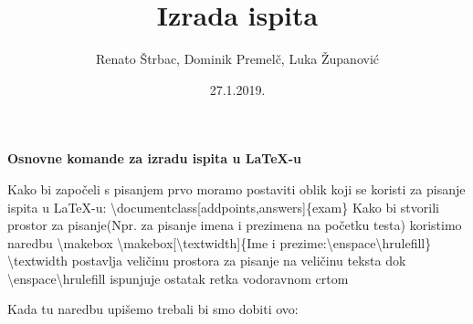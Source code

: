 \documentclass[addpoints,answers]{beamer}
\newcounter{points}
\begin{document}
	\title{Izrada ispita}
	\date{27.1.2019.}
	\author{Renato Štrbac, Dominik Premelč, Luka Županović}
	
	
	\maketitle
	\tableofcontents
	
\begin{frame}
	\begin{center}
		\textbf{Osnovne komande za izradu ispita u LaTeX-u}
	\end{center}
\end{frame}

\begin{frame}
Kako bi započeli s pisanjem prvo moramo postaviti oblik koji se koristi za pisanje ispita u LaTeX-u:
\newline
\newline
\color{blue}
\textbackslash{documentclass[addpoints,answers]\{exam\}}
\color{black}
\newline
\newline
Kako bi stvorili prostor za pisanje(Npr. za pisanje imena i prezimena na početku testa) koristimo naredbu \textbackslash{makebox}
\newline
\newline
\color{blue}
\textbackslash{makebox[\textbackslash{textwidth}]}\{Ime i prezime:\textbackslash{enspace\textbackslash{hrulefill}}\}
\color{black}
\newline
\newline
\textbackslash{textwidth} postavlja veličinu prostora za pisanje na veličinu teksta dok \textbackslash{enspace\textbackslash{hrulefill}} ispunjuje ostatak retka vodoravnom crtom
\end{frame}

\begin{frame}
Kada tu naredbu upišemo trebali bi smo dobiti ovo:
\newline
\newline
{}
\end{frame}
\end{document}
